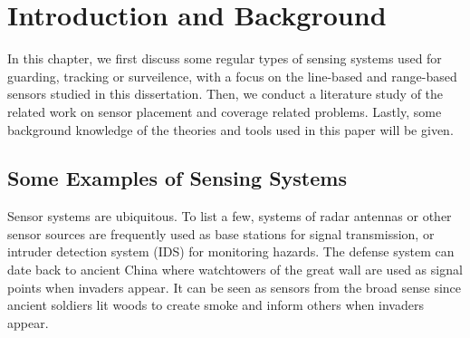
\chapter{Introduction and Background} 
\thispagestyle{myheadings} 
In this chapter, we first discuss some regular types of sensing systems 
used for guarding, tracking or surveilence, 
with a focus on the line-based and range-based sensors studied in this dissertation. 
Then, we conduct a literature study of the related work on sensor placement and 
coverage related problems. 
Lastly, some background knowledge of the theories and tools used in this paper will be given. 
\section{Some Examples of Sensing Systems} 
Sensor systems are ubiquitous. To list a few, systems of radar antennas 
or other sensor sources are frequently used as base stations for signal transmission, 
or intruder detection system (IDS) for monitoring hazards. 
The defense system can date back to ancient China where
watchtowers of the great wall are used as signal points when invaders appear. 
It can be seen as sensors from the broad sense
since ancient soldiers lit woods to create smoke and inform others when invaders appear. 
